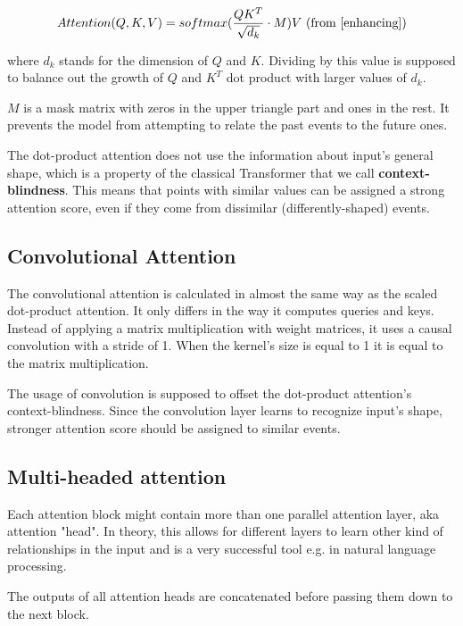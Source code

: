 \documentclass[en]{pracamgr}
\begin{document}
$$Attention(Q, K, V) = softmax(\frac{QK^{T}}{\sqrt{d_k}} \cdot M)V \textrm{ (from \cite{enhancing})} $$

where $d_k$ stands for the dimension of $Q$ and $K$. Dividing by this value is supposed to balance out the growth of $Q$ and $K^{T}$ dot product with larger values of $d_k$.

$M$ is a mask matrix with zeros in the upper triangle part and ones in the rest. It prevents the model from attempting to relate the past events to the future ones.


The dot-product attention does not use the information about input's general shape, which is a property of the classical Transformer that we call \textbf{context-blindness}. This means that points with similar values can be assigned a strong attention score, even if they come from dissimilar (differently-shaped) events.

\subsection{Convolutional Attention}

The convolutional attention\cite{enhancing} is calculated in almost the same way as the scaled dot-product attention. 
It only differs in the way it computes queries and keys.
Instead of applying a matrix multiplication with weight matrices, it uses a causal convolution with a stride of 1. When the kernel's size is equal to 1 it is equal to the matrix multiplication.

The usage of convolution is supposed to offset the dot-product attention's context-blindness. Since the convolution layer learns to recognize input's shape, stronger attention score should be assigned to similar events.

\subsection{Multi-headed attention}

Each attention block might contain more than one parallel attention layer, aka attention "head". In theory, this allows for different layers to learn other kind of relationships in the input and is a very successful tool e.g. in natural language processing\cite{tr}.

The outputs of all attention heads are concatenated before passing them down to the next block.


\end{document}
